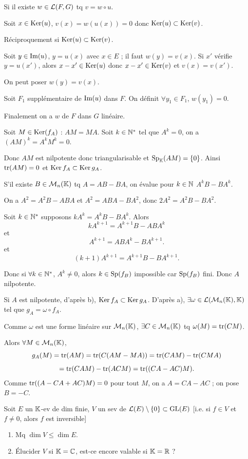 \begin{solution}
Si il existe $w\in\mathcal L(F,G)$ tq $v=w\circ u$.

Soit $x\in\operatorname{Ker}(u)$, $v(x)=w(u(x))=0$ donc $\operatorname{Ker}(u)\subset\operatorname{Ker}(v)$.

Réciproquement si $\operatorname{Ker}(u)\subset\operatorname{Ker}(v)$.

Soit $y\in\operatorname{Im}(u)$, $y=u(x)$ avec $x\in E$ ; il faut
$w(y)=v(x)$. Si $x'$ vérifie $y=u(x')$, alors $x-x'\in\operatorname{Ker}(u)$ donc
$x-x'\in\operatorname{Ker}(v)$ et $v(x)=v(x')$.

On peut poser $w(y)=v(x)$.

Soit $F_1$ supplémentaire de $\operatorname{Im}(u)$ dans $F$.
On définit $\forall y_1\in F_1$, $w(y_1)=0$.

Finalement on a $w$ de $F$ dans $G$ linéaire.

Soit $M\in\operatorname{Ker}(f_A)$ : $AM=MA$.
Soit $k\in\mathbb N^*$ tel que $A^k=0$, on a $(AM)^k=A^kM^k=0$.

Donc $AM$ est nilpotente donc triangularisable et $\operatorname{Sp}_\mathbb K(AM)=\{0\}$.
Ainsi $\operatorname{tr}(AM)=0$ et $\operatorname{Ker} f_A\subset\operatorname{Ker} g_A$.

S'il existe $B\in\mathcal M_n(\mathbb K)$ tq $A=AB-BA$, on évalue pour $k\in\mathbb N$
$A^kB-BA^k$.

On a $A^2=A^2B-ABA$ et $A^2=ABA-BA^2$, donc
$2A^2=A^2B-BA^2$.

Soit $k\in\mathbb N^*$ supposons $kA^k=A^kB-BA^k$.
Alors
\[
kA^{k+1}=A^{k+1}B-ABA^k
\]
et
\[
A^{k+1}=AB A^k-BA^{k+1}.
\]
et
\[
(k+1)A^{k+1}=A^{k+1}B-BA^{k+1}.
\]

Donc si $\forall k\in\mathbb N^*$, $A^k\neq0$, alors $k\in\operatorname{Sp}(f_B)$
impossible car $\operatorname{Sp}(f_B)$ fini. Donc $A$ nilpotente.

Si $A$ est nilpotente, d'après b), $\operatorname{Ker} f_A\subset\operatorname{Ker} g_A$.
D'après a), $\exists\omega\in\mathcal L(\mathcal M_n(\mathbb K),\mathbb K)$ tel que $g_A=\omega\circ f_A$.

Comme $\omega$ est une forme linéaire sur $\mathcal M_n(\mathbb K)$, $\exists C\in\mathcal M_n(\mathbb K)$
tq $\omega(M)=\operatorname{tr}(CM)$.

Alors $\forall M\in\mathcal M_n(\mathbb K)$,
\[
g_A(M)=\operatorname{tr}(AM)=\operatorname{tr}(C(AM-MA))=\operatorname{tr}(CAM)-\operatorname{tr}(CMA)
\]
\[
=\operatorname{tr}(CAM)-\operatorname{tr}(ACM)=\operatorname{tr}((CA-AC)M).
\]
Comme $\operatorname{tr}((A-CA+AC)M)=0$ pour tout $M$, on a $A=CA-AC$ ; on pose $B=-C$.
\end{solution}


\begin{statementbox}
Soit $E$ un $\mathbb K$-ev de dim finie, $V$ un sev de
$\mathcal L(E)\setminus \{0\}\subset \operatorname{GL}(E)$ [i.e. si $f\in V$ et $f\neq 0$, alors
$f$ est inversible]
\begin{enumerate}[label=\alph*)]
  \item Mq $\dim V\leq \dim E$.
  \item Élucider $V$ si $\mathbb K=\mathbb C$, est-ce encore valable si $\mathbb K=\mathbb R$ ?
\end{enumerate}
\end{statementbox}


